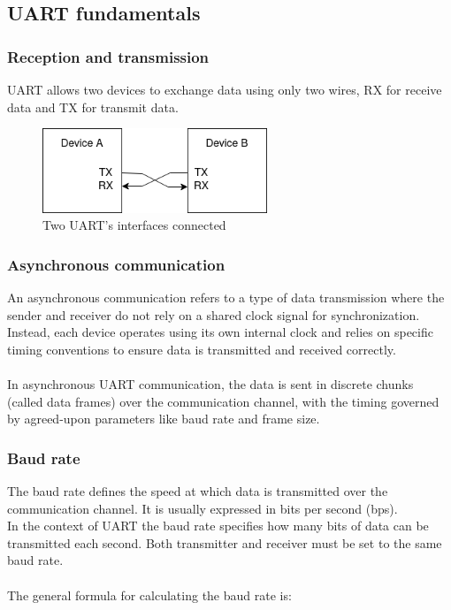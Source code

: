 \documentclass[12pt]{article}
\begin{document}
\subsection{UART fundamentals}
\subsubsection{Reception and transmission}
UART allows two devices to exchange data using only two wires, RX for receive data
and TX for transmit data.\\
\begin{figure}[h]
  \centering
  \includegraphics[width=0.6\textwidth]{UART_interface.png}
  \caption{Two UART's interfaces connected}
\end{figure}


\subsubsection{Asynchronous communication}
An asynchronous communication refers to a type of data transmission where the sender
and receiver do not rely on a shared clock signal for synchronization. Instead, each
device operates using its own internal clock and relies on specific timing 
conventions to ensure data is transmitted and received correctly. \\~\\
In asynchronous UART communication, the data is sent in discrete chunks 
(called data frames) over the communication channel, with the timing governed by 
agreed-upon parameters like baud rate and frame size.

\subsubsection{Baud rate}
The baud rate defines the speed at which data is transmitted over the communication
channel. It is usually expressed in bits per second (bps). \\
In the context of UART the baud rate specifies how many bits of data can be 
transmitted each second. Both transmitter and receiver must be set to the same baud
rate. \\~\\
The general formula for calculating the baud rate is:
\end{document}
